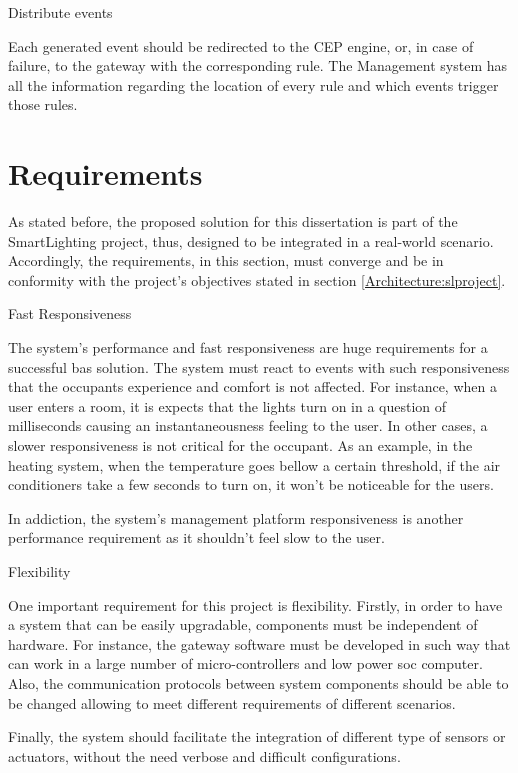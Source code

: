 \begin{Paragraph}{Distribute events}
	
Each generated event should be redirected to the CEP engine, or, in case of failure, to the gateway with the corresponding rule. The Management system has all the information regarding the location of every rule and which events trigger those rules. 
	
\end{Paragraph}


\section{Requirements}
\label{Architecture:Requirements}
As stated before, the proposed solution for this dissertation is part of the SmartLighting project, thus, designed to be integrated in a real-world scenario. Accordingly, the requirements, in this section, must converge and be in conformity with the project's objectives stated in section \ref{Architecture:slproject}. 

\begin{Paragraph}{Fast Responsiveness}

The system's performance and fast responsiveness are huge requirements for a successful \ac{bas} solution. The system must react to events with such responsiveness that the occupants experience and comfort is not affected. For instance, when a user enters a room, it is expects that the lights turn on in a question of milliseconds causing an instantaneousness feeling to the user. In other cases, a slower responsiveness is not critical for the occupant. As an example, in the heating system, when the temperature goes bellow a certain threshold, if the air conditioners take a few seconds to turn on, it won't be noticeable for the users.

In addiction, the system's management platform responsiveness is another performance requirement as it shouldn't feel slow to the user.

\end{Paragraph}

\begin{Paragraph}{Flexibility}

One important requirement for this project is flexibility. Firstly, in order to have a system that can be easily upgradable, components must be independent of hardware. For instance, the gateway software must be developed in such way that can work in a large number of micro-controllers and  low power \ac{soc} computer. Also, the communication protocols between system components should be able to be changed allowing to meet different requirements of different scenarios. 


Finally, the system should facilitate the integration of different type of sensors or actuators, without the need verbose and difficult configurations.

\end{Paragraph}

